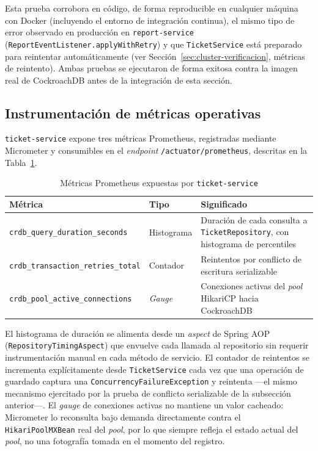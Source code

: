 Esta prueba corrobora en código, de forma reproducible en cualquier máquina con Docker
(incluyendo el entorno de integración continua), el mismo tipo de error observado en producción
en \texttt{report-service} (\texttt{ReportEventListener.applyWithRetry}) y que
\texttt{TicketService} está preparado para reintentar automáticamente (ver
Sección~\ref{sec:cluster-verificacion}, métricas de reintento). Ambas pruebas se ejecutaron de
forma exitosa contra la imagen real de CockroachDB antes de la integración de esta sección.

\subsection{Instrumentación de métricas operativas}

\texttt{ticket-service} expone tres métricas Prometheus, registradas mediante Micrometer y
consumibles en el \emph{endpoint} \texttt{/actuator/prometheus}, descritas en la
Tabla~\ref{tab:metricas}.

\begin{table}[H]
\centering
\caption{Métricas Prometheus expuestas por \texttt{ticket-service}}
\label{tab:metricas}
\begin{tabular}{@{}p{4.3cm}p{1.8cm}p{6.7cm}@{}}
\toprule
\textbf{Métrica} & \textbf{Tipo} & \textbf{Significado} \\
\midrule
\texttt{crdb\_query\_duration\_seconds} & Histograma & Duración de cada consulta a \texttt{TicketRepository}, con histograma de percentiles \\
\texttt{crdb\_transaction\_retries\_total} & Contador & Reintentos por conflicto de escritura serializable \\
\texttt{crdb\_pool\_active\_connections} & \emph{Gauge} & Conexiones activas del \emph{pool} HikariCP hacia CockroachDB \\
\bottomrule
\end{tabular}
\end{table}

El histograma de duración se alimenta desde un \emph{aspect} de Spring AOP
(\texttt{RepositoryTimingAspect}) que envuelve cada llamada al repositorio sin requerir
instrumentación manual en cada método de servicio. El contador de reintentos se incrementa
explícitamente desde \texttt{TicketService} cada vez que una operación de guardado captura una
\texttt{ConcurrencyFailureException} y reintenta —el mismo mecanismo ejercitado por la prueba de
conflicto serializable de la subsección anterior—. El \emph{gauge} de conexiones activas no
mantiene un valor cacheado: Micrometer lo reconsulta bajo demanda directamente contra el
\texttt{HikariPoolMXBean} real del \emph{pool}, por lo que siempre refleja el estado actual del
\emph{pool}, no una fotografía tomada en el momento del registro.

